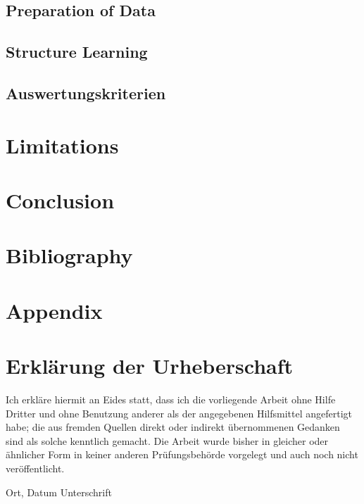 \documentclass[12pt]{report}
\begin{document}
	\section{Preparation of Data}
	\section{Structure Learning}
	\section{Auswertungskriterien}	
	\chapter{Limitations}	
	\chapter{Conclusion}
	
	\newpage
	\clearpage
	
	
	
	\chapter*{Bibliography}
	
	
	
	\newpage
	
	
	\appendix %
	\pagestyle{empty}
	\setcounter{page}{1}
	\chapter{Appendix}
	
	\chapter*{Erklärung der Urheberschaft}
	
	Ich erkläre hiermit an Eides statt, dass ich die vorliegende Arbeit
	ohne Hilfe Dritter und ohne Benutzung anderer als der angegebenen
	Hilfsmittel angefertigt habe; die aus fremden Quellen direkt oder
	indirekt übernommenen Gedanken sind als solche kenntlich gemacht. Die
	Arbeit wurde bisher in gleicher oder ähnlicher Form in keiner anderen
	Prüfungsbehörde vorgelegt und auch noch nicht veröffentlicht.
	
	\vspace{4cm}
	
	\hspace{2cm} Ort, Datum \hfill Unterschrift \hspace{2cm}
	
	
	
\end{document}
